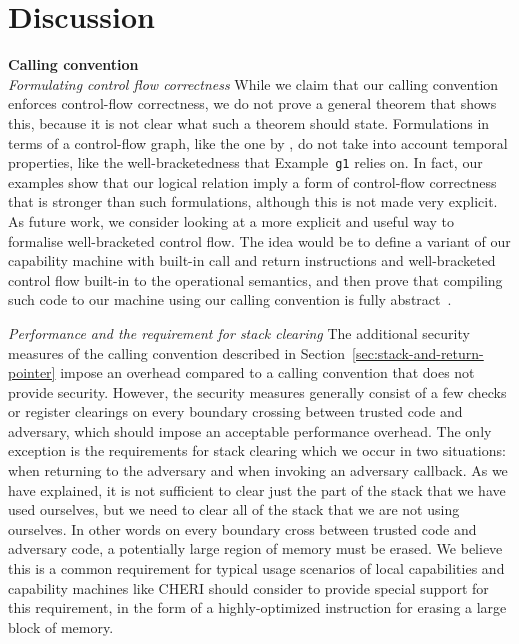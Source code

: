 \documentclass[compsoc,conference,letterpaper,fleqn]{IEEEtran}
\begin{document}
\section{Discussion}
\label{sec:discussion}
\noindent\textbf{Calling convention}\\
\emph{Formulating control flow correctness} While we claim that our calling convention enforces control-flow
correctness, we do not prove a general theorem that shows this, because it is not clear what such a theorem should state. Formulations in terms of a control-flow graph, like the one by
\cite{abadi_control-flow_2005}, do not take into account temporal properties,
like the well-bracketedness that Example~\texttt{\footnotesize{g1}} relies on.
In fact, our examples show that our logical relation imply a form of
control-flow correctness that is stronger than such formulations, although this
is not made very explicit. As future work, we consider looking at a more
explicit and useful way to formalise well-bracketed control flow. The idea would
be to define a variant of our capability machine with built-in call and return
instructions and well-bracketed control flow built-in to the operational
semantics, and then prove that compiling such code to our machine using our
calling convention is fully abstract~\cite{abadi_protection_1998}.

\emph{Performance and the requirement for stack clearing} 
The additional security measures of the calling convention described in
Section~\ref{sec:stack-and-return-pointer} impose an overhead compared to
a calling convention that does not provide security. However, the security measures generally consist of a
few checks or register clearings on every boundary crossing between trusted code
and adversary, which should impose an acceptable performance overhead. The only
exception is the requirements for stack clearing which we occur in two
situations: when returning to the adversary and when invoking an adversary
callback. As we have explained, it is not sufficient to clear just the part of
the stack that we have used ourselves, but we need to clear all of the stack that we are not using ourselves. 
In other words on every boundary cross between trusted code and adversary code, a potentially large region of memory must be erased.
We believe this is a common requirement for typical usage scenarios of local capabilities and
capability machines like CHERI should consider to provide special support for
this requirement, in the form of a highly-optimized instruction for erasing
a large block of memory.
\end{document}
